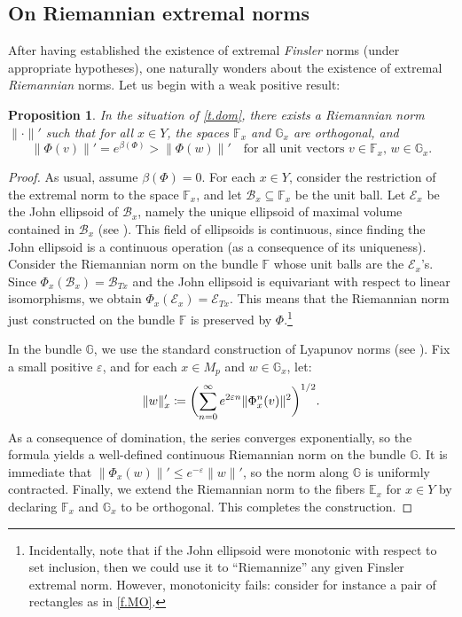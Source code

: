 \documentclass[10pt]{amsart}
\let\mathcal\mathscr
\def\vcentcolon{\mathrel{\mathop\ordinarycolon}}
\providecommand\ordinarycolon{:}
\providecommand*\coloneqq{\vcentcolon\mathrel{\mkern-1.2mu}=}
\theoremstyle{plain}
\newtheorem{proposition}[theorem]{Proposition}
\theoremstyle{definition}
\newcommand{\EE}{\mathbb{E}}
\newcommand{\FF}{\mathbb{F}}
\newcommand{\GG}{\mathbb{G}}
\newcommand{\cB}{\mathcal{B}}
\newcommand{\cE}{\mathcal{E}}
\let\epsilon\varepsilon
\begin{document}
\subsection{On Riemannian extremal norms}\label{ss.Riemann}

After having established the existence of extremal \emph{Finsler} norms (under appropriate hypotheses), one naturally wonders about the existence of extremal \emph{Riemannian} norms.
Let us begin with a weak positive result:

\begin{proposition}\label{p.Riem_weak}
In the situation of \cref{t.dom}, there exists a Riemannian norm $\| \mathord{\cdot} \|'$ such that for all $x \in Y$, the spaces $\FF_x$ and $\GG_x$ are orthogonal, and
\[
\| \Phi(v) \|' = e^{\beta(\Phi)} > \|\Phi(w)\|'
\quad \text{for all unit vectors $v \in \FF_x$, $w \in \GG_x$.}
\]
\end{proposition}

\begin{proof}
As usual, assume $\beta(\Phi) = 0$.
For each $x \in Y$, consider the restriction of the extremal norm to the space $\FF_x$, and let $\cB_x \subseteq \FF_x$ be the unit ball.
Let $\cE_x$ be the John ellipsoid of $\cB_x$, namely the unique ellipsoid of maximal volume contained in $\cB_x$ (see \eg \cite{Ball}). This field of ellipsoids is continuous, since finding the John ellipsoid is a continuous operation (as a consequence of its uniqueness).
Consider the Riemannian norm on the bundle $\FF$ whose unit balls are the $\cE_x$'s. Since $\Phi_x (\cB_x) = \cB_{Tx}$ and the John ellipsoid is equivariant with respect to linear isomorphisms, we obtain $\Phi_x (\cE_x) = \cE_{Tx}$. This means that the Riemannian norm just constructed on the bundle $\FF$ is preserved by $\Phi$.\footnote{Incidentally, note that if the John ellipsoid were monotonic with respect to set inclusion, then we could use it to ``Riemannize'' any given Finsler extremal norm. However, monotonicity fails: consider for instance a pair of rectangles as in \cref{f.MO}.}

In the bundle $\GG$, we use the standard construction of Lyapunov norms (see \eg \cite[p.\,667]{KH}).
Fix a small positive $\epsilon$, and for each $x \in M_p$ and $w \in \GG_x$, let:
\[
\| w \|'_x \coloneqq \biggl( \sum_{n=0}^\infty e^{2 \epsilon n} \|\Phi_x^n (v) \|^2 \biggr)^{1/2}.
\]
As a consequence of domination, the series converges exponentially, so the formula yields a well-defined continuous Riemannian norm on the bundle $\GG$.
It is immediate that $\|\Phi_x(w)\|' \le e^{-\epsilon} \|w\|'$, so the norm along $\GG$ is uniformly contracted.
Finally, we extend the Riemannian norm to the fibers $\EE_x$ for $x \in Y$ by declaring $\FF_x$ and $\GG_x$ to be orthogonal.
This completes the construction.
\end{proof}
\end{document}
